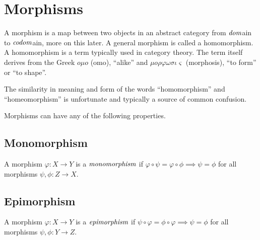 \documentclass[10pt, oneside, reqno]{amsart}
\begin{document}
\section{Morphisms} %
\label{sec:morphisms}
A morphism is a map between two objects in an abstract category from $\emph{dom}$ain to $\emph{codom}$ain, more on this later.
A general morphism is called a homomorphism. A homomorphism is a term typically used in category theory.
The term itself derives from the Greek $o \mu o$ (omo), ``alike'' and $\mu o \rho\varphi\omega\sigma\iota\varsigma$
(morphosis), ``to form'' or ``to shape''.
\begin{rem}
 The similarity in meaning and form of the words ``homomorphism'' and ``homeomorphism'' is unfortunate and typically
 a source of common confusion.
\end{rem}

Morphisms can have any of the following properties.

\subsection{Monomorphism} %
\label{subsec:monomorphism}
\begin{defn}[Monomorphism]
 A morphism $\varphi: X \to Y$ is a $\emph{monomorphism}$ if $\varphi \circ \psi = \varphi \circ \phi \implies \psi = \phi$ for all morphisms $\psi,\phi: Z \to X$.
 \\
 \end{defn}

\subsection{Epimorphism} %
\label{subsec:epimorphism}
\begin{defn}[Epimorphism]
 A morphism $\varphi: X \to Y$ is a $\emph{epimorphism}$ if $\psi \circ \varphi = \phi \circ \varphi \implies \psi = \phi$ for all morphisms $\psi,\phi: Y \to Z$.
 \\
\end{defn}
 
\end{document}
